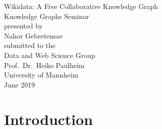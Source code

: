 ﻿\documentclass[11pt,titlepage,oneside,openany]{book}
\begin{document}
\begin{titlepage}
	\vspace*{2cm}
  \begin{center}
   {\Large Wikidata: A Free Collaborative Knowledge Graph\\}
   \vspace{2cm} 
   {Knowledge Graphs Seminar\\}
   \vspace{2cm}
   {presented by\\
    Nahor Gebretensae\\
   }
   \vspace{1cm} 
   {submitted to the\\
    Data and Web Science Group\\
    Prof.\ Dr.\ Heiko Paulheim\\
    University of Mannheim\\} \vspace{2cm}
   {June 2019}
  \end{center}
\end{titlepage}


\tableofcontents

\listoffigures

\listoftables

\newpage


\chapter{Introduction}
\label{chap:intro}
\end{document}
